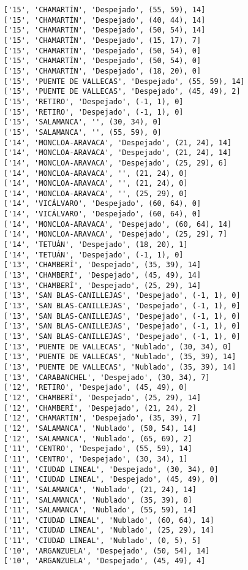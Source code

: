 \documentclass[11pt]{article}
\begin{document}
\begin{Verbatim}[commandchars=\\\{\}]
['15', 'CHAMARTÍN', 'Despejado', (55, 59), 14]
['15', 'CHAMARTÍN', 'Despejado', (40, 44), 14]
['15', 'CHAMARTÍN', 'Despejado', (50, 54), 14]
['15', 'CHAMARTÍN', 'Despejado', (15, 17), 7]
['15', 'CHAMARTÍN', 'Despejado', (50, 54), 0]
['15', 'CHAMARTÍN', 'Despejado', (50, 54), 0]
['15', 'CHAMARTÍN', 'Despejado', (18, 20), 0]
['15', 'PUENTE DE VALLECAS', 'Despejado', (55, 59), 14]
['15', 'PUENTE DE VALLECAS', 'Despejado', (45, 49), 2]
['15', 'RETIRO', 'Despejado', (-1, 1), 0]
['15', 'RETIRO', 'Despejado', (-1, 1), 0]
['15', 'SALAMANCA', '', (30, 34), 0]
['15', 'SALAMANCA', '', (55, 59), 0]
['14', 'MONCLOA-ARAVACA', 'Despejado', (21, 24), 14]
['14', 'MONCLOA-ARAVACA', 'Despejado', (21, 24), 14]
['14', 'MONCLOA-ARAVACA', 'Despejado', (25, 29), 6]
['14', 'MONCLOA-ARAVACA', '', (21, 24), 0]
['14', 'MONCLOA-ARAVACA', '', (21, 24), 0]
['14', 'MONCLOA-ARAVACA', '', (25, 29), 0]
['14', 'VICÁLVARO', 'Despejado', (60, 64), 0]
['14', 'VICÁLVARO', 'Despejado', (60, 64), 0]
['14', 'MONCLOA-ARAVACA', 'Despejado', (60, 64), 14]
['14', 'MONCLOA-ARAVACA', 'Despejado', (25, 29), 7]
['14', 'TETUÁN', 'Despejado', (18, 20), 1]
['14', 'TETUÁN', 'Despejado', (-1, 1), 0]
['13', 'CHAMBERÍ', 'Despejado', (35, 39), 14]
['13', 'CHAMBERÍ', 'Despejado', (45, 49), 14]
['13', 'CHAMBERÍ', 'Despejado', (25, 29), 14]
['13', 'SAN BLAS-CANILLEJAS', 'Despejado', (-1, 1), 0]
['13', 'SAN BLAS-CANILLEJAS', 'Despejado', (-1, 1), 0]
['13', 'SAN BLAS-CANILLEJAS', 'Despejado', (-1, 1), 0]
['13', 'SAN BLAS-CANILLEJAS', 'Despejado', (-1, 1), 0]
['13', 'SAN BLAS-CANILLEJAS', 'Despejado', (-1, 1), 0]
['13', 'PUENTE DE VALLECAS', 'Nublado', (30, 34), 0]
['13', 'PUENTE DE VALLECAS', 'Nublado', (35, 39), 14]
['13', 'PUENTE DE VALLECAS', 'Nublado', (35, 39), 14]
['13', 'CARABANCHEL', 'Despejado', (30, 34), 7]
['12', 'RETIRO', 'Despejado', (45, 49), 0]
['12', 'CHAMBERÍ', 'Despejado', (25, 29), 14]
['12', 'CHAMBERÍ', 'Despejado', (21, 24), 2]
['12', 'CHAMARTÍN', 'Despejado', (35, 39), 7]
['12', 'SALAMANCA', 'Nublado', (50, 54), 14]
['12', 'SALAMANCA', 'Nublado', (65, 69), 2]
['11', 'CENTRO', 'Despejado', (55, 59), 14]
['11', 'CENTRO', 'Despejado', (30, 34), 1]
['11', 'CIUDAD LINEAL', 'Despejado', (30, 34), 0]
['11', 'CIUDAD LINEAL', 'Despejado', (45, 49), 0]
['11', 'SALAMANCA', 'Nublado', (21, 24), 14]
['11', 'SALAMANCA', 'Nublado', (35, 39), 0]
['11', 'SALAMANCA', 'Nublado', (55, 59), 14]
['11', 'CIUDAD LINEAL', 'Nublado', (60, 64), 14]
['11', 'CIUDAD LINEAL', 'Nublado', (25, 29), 14]
['11', 'CIUDAD LINEAL', 'Nublado', (0, 5), 5]
['10', 'ARGANZUELA', 'Despejado', (50, 54), 14]
['10', 'ARGANZUELA', 'Despejado', (45, 49), 4]

\end{Verbatim}
\end{document}
